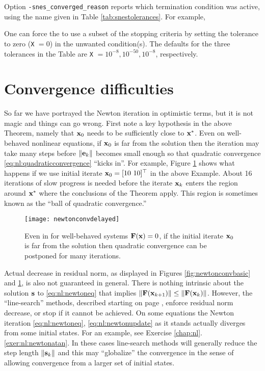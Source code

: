 \medskip
Option \texttt{-snes\_converged\_reason} reports which termination condition was active, using the name given in Table \ref{tab:snestolerances}.  For example,

One can force the \pSNES to use a subset of the stopping criteria by setting the tolerance to zero (\texttt{X} $=0$) in the unwanted condition(s).  The defaults for the three tolerances in the Table are \texttt{X} $=10^{-8},10^{-50},10^{-8}$, respectively.


\section{Convergence difficulties} \label{sec:divergence}

So far we have portrayed the Newton iteration in optimistic terms, but it is not magic and things can go wrong.  First note a key hypothesis in the above Theorem, namely that $\mathbf{x}_0$ needs to be sufficiently close to $\mathbf{x}^*$.  Even on well-behaved nonlinear equations, if $\mathbf{x}_0$ is far from the solution then the iteration may take many steps before $\|\mathbf{e}_k\|$ becomes small enough so that quadratic convergence \eqref{eq:nl:quadraticconvergence} ``kicks in''.  For example, Figure \ref{fig:newtonconvdelayed} shows what happens if we use initial iterate $\mathbf{x}_0=[10\,\, 10]^\top$ in the above Example.  About 16 iterations of slow progress is needed before the iterate $\mathbf{x}_k$ enters the region around $\mathbf{x}^*$ where the conclusions of the Theorem apply.  This region is sometimes known as the ``ball of quadratic convergence.''

\begin{figure}
\texttt{[image: newtonconvdelayed]}
\caption{Even in for well-behaved systems $\mathbf{F}(\mathbf{x})=0$, if the initial iterate $\mathbf{x}_0$ is far from the solution then quadratic convergence can be postponed for many iterations.}
\label{fig:newtonconvdelayed}
\end{figure}

Actual decrease in residual norm, as displayed in Figures \ref{fig:newtonconvbasic} and \ref{fig:newtonconvdelayed}, is also not guaranteed in general.  There is nothing intrinsic about the solution $\mathbf{s}$ to \eqref{eq:nl:newtoneq} that implies $\|\mathbf{F}(\mathbf{x}_{k+1})\| \le \|\mathbf{F}(\mathbf{x}_k)\|$.  However, the ``line-search'' methods, described starting on page \pageref{sec:linesearch}, enforce residual norm decrease, or stop if it cannot be achieved.  On some equations the Newton iteration \eqref{eq:nl:newtoneq}, \eqref{eq:nl:newtonupdate} as it stands actually diverges from some initial states.  For an example, see Exercise \ref{chap:nl}.\ref{exer:nl:newtonatan}.  In these cases line-search methods will generally reduce the step length $\|\mathbf{s}_k\|$ and this may ``globalize'' the convergence \citep{Kelley2003} in the sense of allowing convergence from a larger set of initial states.

